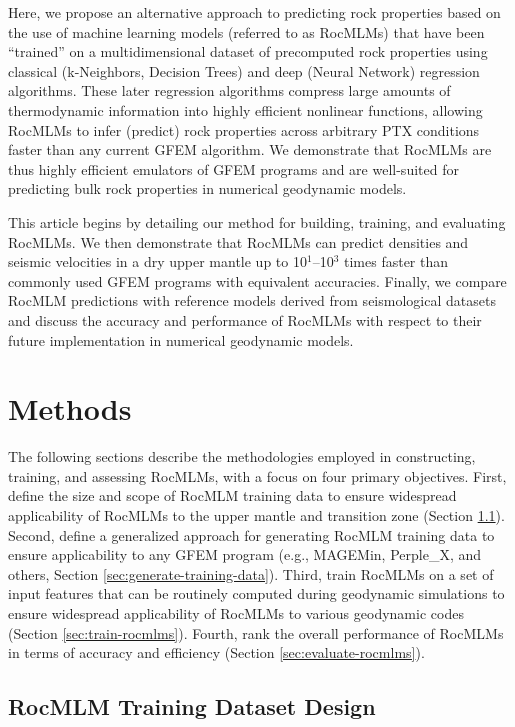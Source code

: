 \documentclass[draft,linenumbers]{agujournal2018}
\begin{document}
Here, we propose an alternative approach to predicting rock properties based on the use of machine learning models (referred to as RocMLMs) that have been ``trained'' on a multidimensional dataset of precomputed rock properties using classical (k-Neighbors, Decision Trees) and deep (Neural Network) regression algorithms. These later regression algorithms compress large amounts of thermodynamic information into highly efficient nonlinear functions, allowing RocMLMs to infer (predict) rock properties across arbitrary PTX conditions faster than any current GFEM algorithm. We demonstrate that RocMLMs are thus highly efficient emulators of GFEM programs and are well-suited for predicting bulk rock properties in numerical geodynamic models.

This article begins by detailing our method for building, training, and evaluating RocMLMs. We then demonstrate that RocMLMs can predict densities and seismic velocities in a dry upper mantle up to 10\(^1\)--10\(^3\) times faster than commonly used GFEM programs with equivalent accuracies. Finally, we compare RocMLM predictions with reference models derived from seismological datasets \citep{dziewonski1981, kustowski2008} and discuss the accuracy and performance of RocMLMs with respect to their future implementation in numerical geodynamic models.

\section{Methods}\label{sec:methods}

The following sections describe the methodologies employed in constructing, training, and assessing RocMLMs, with a focus on four primary objectives. First, define the size and scope of RocMLM training data to ensure widespread applicability of RocMLMs to the upper mantle and transition zone (Section \ref{sec:training-data-design}). Second, define a generalized approach for generating RocMLM training data to ensure applicability to any GFEM program (e.g., MAGEMin, Perple\_X, and others, Section \ref{sec:generate-training-data}). Third, train RocMLMs on a set of input features that can be routinely computed during geodynamic simulations to ensure widespread applicability of RocMLMs to various geodynamic codes (Section \ref{sec:train-rocmlms}). Fourth, rank the overall performance of RocMLMs in terms of accuracy and efficiency (Section \ref{sec:evaluate-rocmlms}).

\subsection{RocMLM Training Dataset Design}\label{sec:training-data-design}
\end{document}
